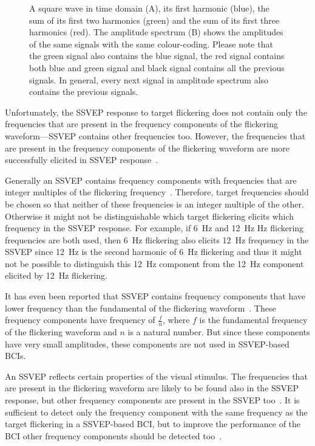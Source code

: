 \begin{figure}[h]
	
	\caption{A square wave in time domain (A), its first harmonic (blue), the sum of its first two harmonics (green) and the sum of its first three harmonics (red). The amplitude spectrum (B) shows the amplitudes of the same signals with the same colour-coding. Please note that the green signal also contains the blue signal, the red signal contains both blue and green signal and black signal contains all the previous signals. In general, every next signal in amplitude spectrum also contains the previous signals.}
	\label{fig:square_wave}
\end{figure}

Unfortunately, the \gls{SSVEP} response to \gls{target} \gls{flickering} does not contain only the frequencies that are present in the \glspl{frequency component} of the \gls{flickering waveform}---\gls{SSVEP} contains other frequencies too. However, the frequencies that are present in the \glspl{frequency component} of the \gls{flickering waveform} are more successfully elicited in \gls{SSVEP} response~\cite{square_sine}.

Generally an \gls{SSVEP} contains \glspl{frequency component} with frequencies that are integer multiples of the \gls{flickering} frequency~\cite{ssvep_response}. Therefore, \gls{target} frequencies should be chosen so that neither of these frequencies is an integer multiple of the other. Otherwise it might not be distinguishable which \gls{target} \gls{flickering} elicits which frequency in the \gls{SSVEP} response. For example, if \SI{6}{Hz} and \SI{12}{Hz} Hz \gls{flickering} frequencies are both used, then \SI{6}{Hz} \gls{flickering} also elicits \SI{12}{Hz} frequency in the \gls{SSVEP} since \SI{12}{Hz} is the second harmonic of \SI{6}{Hz} \gls{flickering} and thus it might not be possible to distinguish this \SI{12}{Hz} component from the \SI{12}{Hz} component elicited by \SI{12}{Hz} \gls{flickering}.

It has even been reported that \gls{SSVEP} contains \glspl{frequency component} that have lower frequency than the \gls{fundamental} of the \gls{flickering waveform}~\cite{ssvep_response}. These \glspl{frequency component} have frequency of $\frac{f}{n}$, where $f$ is the \gls{fundamental} frequency of the \gls{flickering waveform} and $n$ is a natural number. But since these components have very small amplitudes, these components are not used in \gls{SSVEP}-based \glspl{BCI}.

An \gls{SSVEP} reflects certain properties of the visual stimulus. The frequencies that are present in the \gls{flickering waveform} are likely to be found also in the \gls{SSVEP} response, but other \glspl{frequency component} are present in the \gls{SSVEP} too~\cite{square_sine}. It is sufficient to detect only the \gls{frequency component} with the same frequency as the \gls{target} \gls{flickering} in a \gls{SSVEP}-based \gls{BCI}, but to improve the performance of the \gls{BCI} other \glspl{frequency component} should be detected too~\cite{harmonic_imrpovement}.

